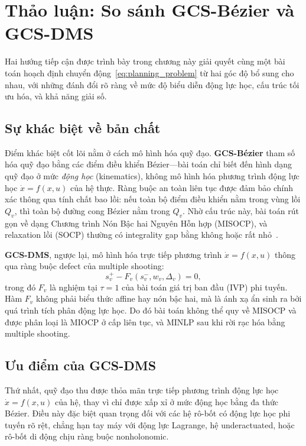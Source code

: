 \section{Thảo luận: So sánh GCS-Bézier và GCS-DMS}
\label{sec:discussion}

Hai hướng tiếp cận được trình bày trong chương này giải quyết cùng một bài toán hoạch định chuyển động~\eqref{eq:planning_problem} từ hai góc độ bổ sung cho nhau, với những đánh đổi rõ ràng về mức độ biểu diễn động lực học, cấu trúc tối ưu hóa, và khả năng giải số.

\subsection{Sự khác biệt về bản chất}
\label{subsec:discussion_fundamental}

Điểm khác biệt cốt lõi nằm ở cách mô hình hóa quỹ đạo. \textbf{GCS-Bézier} tham số hóa quỹ đạo bằng các điểm điều khiển Bézier---bài toán chỉ biết đến hình dạng quỹ đạo ở mức \emph{động học} (kinematics), không mô hình hóa phương trình động lực học $\dot x = f(x,u)$ của hệ thực. Ràng buộc an toàn liên tục được đảm bảo chính xác thông qua tính chất bao lồi: nếu toàn bộ điểm điều khiển nằm trong vùng lồi $Q_v$, thì toàn bộ đường cong Bézier nằm trong $Q_v$. Nhờ cấu trúc này, bài toán rút gọn về dạng Chương trình Nón Bậc hai Nguyên Hỗn hợp (MISOCP), và relaxation lồi (SOCP) thường có integrality gap bằng không hoặc rất nhỏ~\cite{MarcucciEtAl2023GCS,MarcucciEtAl2023MotionPlanning}.

\textbf{GCS-DMS}, ngược lại, mô hình hóa trực tiếp phương trình $\dot x = f(x,u)$ thông qua ràng buộc defect của multiple shooting:
\[
s_v^+ - F_v(s_v^-, w_v, \Delta_v) = 0,
\]
trong đó $F_v$ là nghiệm tại $\tau=1$ của bài toán giá trị ban đầu (IVP) phi tuyến. Hàm $F_v$ không phải biểu thức affine hay nón bậc hai, mà là ánh xạ ẩn sinh ra bởi quá trình tích phân động lực học. Do đó bài toán không thể quy về MISOCP và được phân loại là MIOCP ở cấp liên tục, và MINLP sau khi rời rạc hóa bằng multiple shooting.

\subsection{Ưu điểm của GCS-DMS}
\label{subsec:discussion_ocpdms_pros}

Thứ nhất, quỹ đạo thu được thỏa mãn trực tiếp phương trình động lực học $\dot x = f(x,u)$ của hệ, thay vì chỉ được xấp xỉ ở mức động học bằng đa thức Bézier. Điều này đặc biệt quan trọng đối với các hệ rô-bốt có động lực học phi tuyến rõ rệt, chẳng hạn tay máy với động lực Lagrange, hệ underactuated, hoặc rô-bốt di động chịu ràng buộc nonholonomic.

